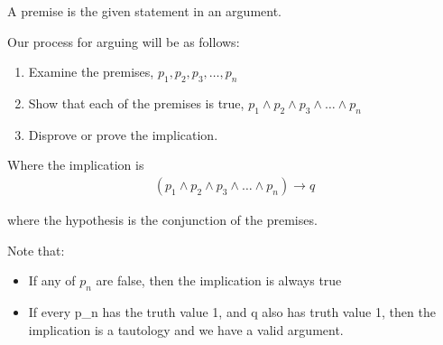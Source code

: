 \documentclass[../../../main.tex]{subfiles}
\begin{document}
\begin{definition}[Premise]
A premise is the given statement in an argument.
\end{definition}

Our process for arguing will be as follows:

\begin{enumerate}
    \item Examine the premises, $p_1, p_2, p_3, \ldots, p_n$
    \item Show that each of the premises is true, $p_1 \land p_2 \land p_3 \land \ldots \land p_n$ 
    \item Disprove or prove the implication.
\end{enumerate}

Where the implication is 
\begin{align*}
    (p_1 \land p_2 \land p_3 \land \ldots \land p_n) \to q
\end{align*}

where the hypothesis is the conjunction of the premises.

Note that:
\begin{itemize}
    \item If any of $p_n$ are false, then the implication is always true
    \item If every p_n has the truth value 1, and q also has truth value 1,
        then the implication is a tautology and we have a valid argument.
\end{itemize}
\end{document}
